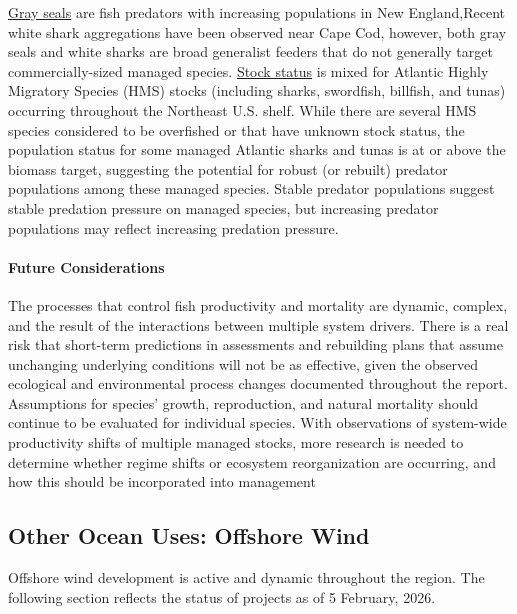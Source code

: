 \documentclass[
  10pt,
]{article}
\begin{document}
\href{https://noaa-edab.github.io/catalog/grayseal.html}{Gray seals} are fish predators with increasing populations in New England,Recent white shark aggregations have been observed near Cape Cod, however, both gray seals and white sharks are broad generalist feeders that do not generally target commercially-sized managed species. \href{https://noaa-edab.github.io/catalog/hms_stock_status.html}{Stock status} is mixed for Atlantic Highly Migratory Species (HMS) stocks (including sharks, swordfish, billfish, and tunas) occurring throughout the Northeast U.S. shelf. While there are several HMS species considered to be overfished or that have unknown stock status, the population status for some managed Atlantic sharks and tunas is at or above the biomass target, suggesting the potential for robust (or rebuilt) predator populations among these managed species. Stable predator populations suggest stable predation pressure on managed species, but increasing predator populations may reflect increasing predation pressure.

\paragraph{Future Considerations}\label{future-considerations-2}

The processes that control fish productivity and mortality are dynamic, complex, and the result of the interactions between multiple system drivers. There is a real risk that short-term predictions in assessments and rebuilding plans that assume unchanging underlying conditions will not be as effective, given the observed ecological and environmental process changes documented throughout the report. Assumptions for species' growth, reproduction, and natural mortality should continue to be evaluated for individual species. With observations of system-wide productivity shifts of multiple managed stocks, more research is needed to determine whether regime shifts or ecosystem reorganization are occurring, and how this should be incorporated into management

\newpage

\subsection{Other Ocean Uses: Offshore Wind}\label{other-ocean-uses-offshore-wind}

Offshore wind development is active and dynamic throughout the region. The following section reflects the status of projects as of 5 February, 2026.
\end{document}
